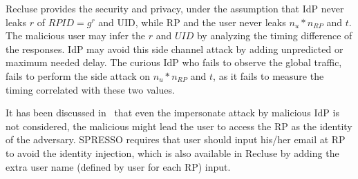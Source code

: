  Recluse provides the security and privacy, under the assumption that IdP never leaks $r$ of $RPID=g^r$ and UID, while RP and the user never leaks $n_u*n_{RP}$ and $t$. The malicious user may infer the $r$ and $UID$ by analyzing the timing difference of the responses. IdP may avoid this side channel attack by adding unpredicted or maximum needed delay. The curious IdP who fails to observe the global traffic, fails to perform the side attack on $n_u*n_{RP}$ and $t$, as it fails to measure the timing correlated with these two values.

 It has been discussed in~\cite{SPRESSO} that even the impersonate attack by malicious IdP is not considered, the malicious might lead the user to access the RP as the identity of the adversary. SPRESSO requires that user should input his/her email at RP to avoid the identity injection, which is also available in Recluse by adding the extra user name (defined by user for each RP) input. 
